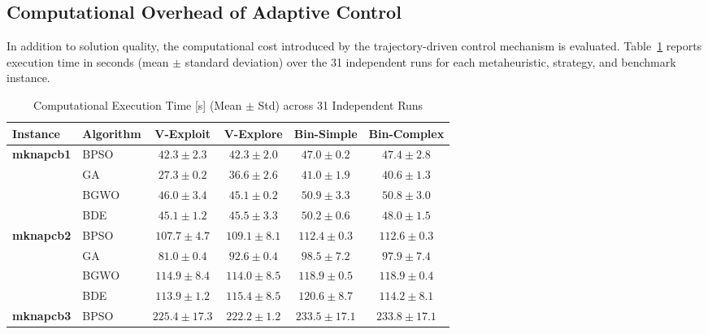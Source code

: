 \documentclass[journal,article,submit,moreauthors]{Definitions/mdpi}
\begin{document}
\subsection{Computational Overhead of Adaptive Control}
\label{subsec:computational_time}

In addition to solution quality, the computational cost introduced by the
trajectory-driven control mechanism is evaluated.
Table~\ref{tab:computational_cost} reports execution time in seconds
(mean $\pm$ standard deviation) over the 31 independent runs for each
metaheuristic, strategy, and benchmark instance.

\begin{table}[htbp]
  \centering
  \small
  \caption{Computational Execution Time [s] (Mean $\pm$ Std) across 31 Independent Runs}
  \label{tab:computational_cost}
  \begin{tabular*}{\textwidth}{@{\extracolsep{\fill}}llcccc@{}}
    \toprule
    \textbf{Instance} & \textbf{Algorithm} & \textbf{V-Exploit} & \textbf{V-Explore} & \textbf{Bin-Simple} & \textbf{Bin-Complex} \\
    \midrule
    \textbf{mknapcb1}  & BPSO  & $42.3 \pm 2.3$ & $\mathbf{42.3 \pm 2.0}$ & $47.0 \pm 0.2$ & $47.4 \pm 2.8$ \\
                       & GA    & $\mathbf{27.3 \pm 0.2}$ & $36.6 \pm 2.6$ & $41.0 \pm 1.9$ & $40.6 \pm 1.3$ \\
                       & BGWO  & $46.0 \pm 3.4$ & $\mathbf{45.1 \pm 0.2}$ & $50.9 \pm 3.3$ & $50.8 \pm 3.0$ \\
                       & BDE   & $\mathbf{45.1 \pm 1.2}$ & $45.5 \pm 3.3$ & $50.2 \pm 0.6$ & $48.0 \pm 1.5$ \\
    \midrule
    \textbf{mknapcb2}  & BPSO  & $\mathbf{107.7 \pm 4.7}$ & $109.1 \pm 8.1$ & $112.4 \pm 0.3$ & $112.6 \pm 0.3$ \\
                       & GA    & $\mathbf{81.0 \pm 0.4}$ & $92.6 \pm 0.4$ & $98.5 \pm 7.2$ & $97.9 \pm 7.4$ \\
                       & BGWO  & $114.9 \pm 8.4$ & $\mathbf{114.0 \pm 8.5}$ & $118.9 \pm 0.5$ & $118.9 \pm 0.4$ \\
                       & BDE   & $\mathbf{113.9 \pm 1.2}$ & $115.4 \pm 8.5$ & $120.6 \pm 8.7$ & $114.2 \pm 8.1$ \\
    \midrule
    \textbf{mknapcb3}  & BPSO  & $225.4 \pm 17.3$ & $\mathbf{222.2 \pm 1.2}$ & $233.5 \pm 17.1$ & $233.8 \pm 17.1$ \\

\end{tabular*}
\end{table}
\end{document}
